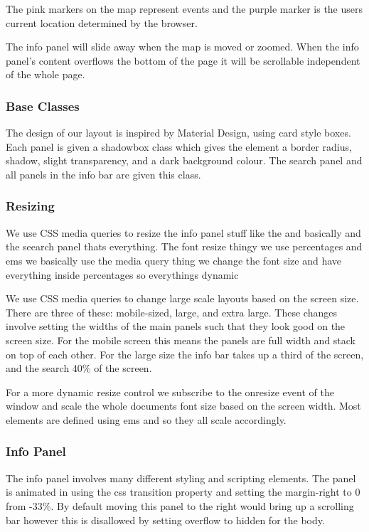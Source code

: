 \documentclass[10pt]{article}
\begin{document}
                The pink markers on the map represent events and the purple marker is the users current location determined by the browser.

                The info panel will slide away when the map is moved or zoomed. When the info panel's content overflows the bottom of the page it will be scrollable independent of the whole page.


            \subsubsection{Base Classes}
                The design of our layout is inspired by Material Design, using card style boxes. Each panel is given a shadowbox class which gives the element a border radius, shadow, slight transparency, and a dark background colour. The search panel and all panels in the info bar are given this class.

            \subsubsection{Resizing}
                We use CSS media queries to resize the info panel stuff like the and basically and the seearch panel thats everything. The font resize thingy we use percentages and ems we basically use the media query thing we change the font size and have everything inside percentages so everythings dynamic

                We use CSS media queries to change large scale layouts based on the screen size. There are three of these: mobile-sized, large, and extra large. These changes involve setting the widths of the main panels such that they look good on the screen size. For the mobile screen this means the panels are full width and stack on top of each other. For the large size the info bar takes up a third of the screen, and the search 40\% of the screen.

                For a more dynamic resize control we subscribe to the onresize event of the window and scale the whole documents font size based on the screen width. Most elements are defined using ems and so they all scale accordingly.

            \subsubsection{Info Panel}
                The info panel involves many different styling and scripting elements. The panel is animated in using the css transition property and setting the margin-right to 0 from -33\%. By default moving this panel to the right would bring up a scrolling bar however this is disallowed by setting overflow to hidden for the body.
\end{document}
